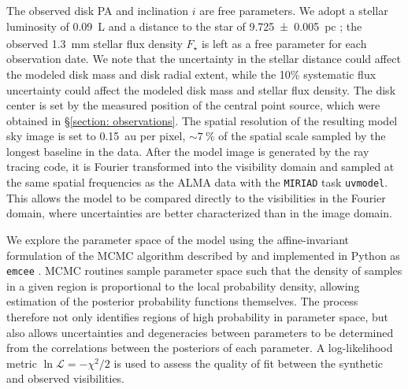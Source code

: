 \documentclass[modern]{aastex62}
\begin{document}
The observed disk PA and inclination $i$ are free parameters.
We adopt a stellar luminosity of \SI{0.09}{L_\sun} \citep{plavchan09} and a distance to the star of \SI{9.725 \pm 0.005}{pc}
\citep{gaia_DR2}; the observed \SI{1.3}{mm} stellar flux density $F_\star$ is left as a free parameter for each observation date.
We note that the uncertainty in the stellar distance could affect the modeled disk mass and disk radial extent, while the 10\% systematic flux uncertainty could affect the modeled disk mass and stellar flux density.
The disk center is set by the measured position of the central point source, which were obtained in \S \ref{section: observations}.
The spatial resolution of the resulting model sky image is set to \SI{0.15}{au} per pixel, $\sim \SI{7}{\percent}$ of the spatial scale sampled by the longest baseline in the data. 
After the model image is generated by the ray tracing code, it is Fourier transformed into the visibility domain and sampled at the same spatial frequencies as the ALMA data with the \texttt{MIRIAD} task \texttt{uvmodel}.
This allows the model to be compared directly to the visibilities in the Fourier domain, where uncertainties are better characterized than in the image domain.

We explore the parameter space of the model using the affine-invariant formulation of the MCMC algorithm described by \citet{goodmanweare10} and implemented in Python as \texttt{emcee} \citep{foreman-mackey13}.  
MCMC routines sample parameter space such that the density of samples in a given region is proportional to the local probability density, allowing estimation of the posterior probability functions themselves.
The process therefore not only identifies regions of high probability in parameter space, but also allows uncertainties and degeneracies between parameters to be determined from the correlations between the posteriors of each parameter. 
A log-likelihood metric $\ln \mathcal{L} = -\chi^2 / 2$ is used to assess the quality of fit between the synthetic and observed visibilities.
\end{document}
